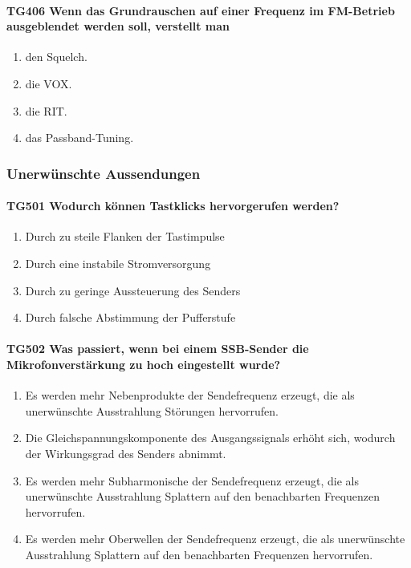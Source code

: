 \documentclass[8pt]{article}
\begin{document}
\paragraph*{TG406 Wenn das Grundrauschen auf einer Frequenz im FM-Betrieb ausgeblendet werden soll, verstellt man}
\begin{enumerate}[nolistsep,label=\Alph*]
\item den Squelch.
\item die VOX.
\item die RIT.
\item das Passband-Tuning.
\end{enumerate}

\pagebreak
\subsubsection{Unerwünschte Aussendungen}
\paragraph*{TG501 Wodurch können Tastklicks hervorgerufen werden?}
\begin{enumerate}[nolistsep,label=\Alph*]
\item Durch zu steile Flanken der Tastimpulse
\item Durch eine instabile Stromversorgung
\item Durch zu geringe Aussteuerung des Senders
\item Durch falsche Abstimmung der Pufferstufe
\end{enumerate}

\paragraph*{TG502 Was passiert, wenn bei einem SSB-Sender die Mikrofonverstärkung zu hoch eingestellt wurde?}
\begin{enumerate}[nolistsep,label=\Alph*]
\item Es werden mehr Nebenprodukte der Sendefrequenz erzeugt, die als unerwünschte Ausstrahlung Störungen hervorrufen.
\item Die Gleichspannungskomponente des Ausgangssignals erhöht sich, wodurch der Wirkungsgrad des Senders abnimmt.
\item Es werden mehr Subharmonische der Sendefrequenz erzeugt, die als unerwünschte Ausstrahlung Splattern auf den benachbarten Frequenzen hervorrufen.
\item Es werden mehr Oberwellen der Sendefrequenz erzeugt, die als unerwünschte Ausstrahlung Splattern auf den benachbarten Frequenzen hervorrufen.
\end{enumerate}
\end{document}
